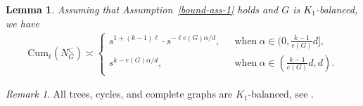 \documentclass{article}
\newtheorem{lemma}[theorem]{Lemma}
\theoremstyle{definition}
\numberwithin{equation}{section}
\theoremstyle{remark}
\newtheorem{remark}[theorem]{Remark}
\newcommand{\cum}{\mathrm{Cum}}
\begin{document}
\begin{lemma}\label{noninteg-upper-1}
Assuming that Assumption~\ref{bound-ass-1} holds and $G$ is $K_1$-balanced, we have
\begin{align}
	\label{cumasym1}
    \cum_\ell(N_G^{\subset})\asymp
\begin{cases}
	s^{1+(k-1)\ell}\cdot s^{-\ell e(G)\alpha/d}, \ \ \ &\mbox{when}~\alpha\in(0,\frac{k-1}{e(G)}d],\\
	s^{k-e(G)\alpha/d}, \ \ \ &\mbox{when}~\alpha\in(\frac{k-1}{e(G)}d,d).
\end{cases}
\end{align}
 \end{lemma}
\begin{remark}
	All trees, cycles, and complete graphs are $K_1$-balanced, see \cite{RucinskiVince86}. 
\end{remark}
\end{document}
